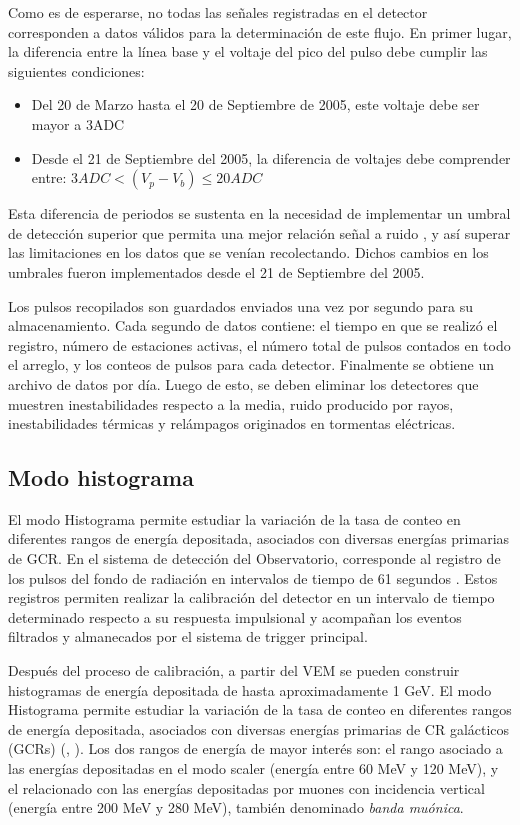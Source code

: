 Como es de esperarse, no todas las señales registradas en el detector corresponden a datos válidos para la determinación de este flujo. En primer lugar, la diferencia entre la línea base y el voltaje del pico del pulso debe cumplir las siguientes condiciones:

\begin{itemize}
    \item Del 20 de Marzo hasta el 20 de Septiembre de 2005, este voltaje debe ser mayor a 3ADC
    \item Desde el 21 de Septiembre del 2005, la diferencia de voltajes debe comprender entre: $3ADC < (V_{p}-V_{b}) \leq 20ADC $
\end{itemize}

Esta diferencia de periodos se sustenta en la necesidad de implementar un umbral de detección superior que permita una mejor relación señal a ruido \cite{bertou_2007}, y así superar las limitaciones en los datos que se venían recolectando. Dichos cambios en los umbrales fueron implementados desde el 21 de Septiembre del 2005.

Los pulsos recopilados son guardados enviados una vez por segundo para su almacenamiento. Cada segundo de datos contiene: el tiempo en que se realizó el registro, número de estaciones activas, el número total de pulsos contados en todo el arreglo, y los conteos de pulsos para cada detector. Finalmente se obtiene un archivo de datos por día. Luego de esto, se deben eliminar los detectores que muestren inestabilidades respecto a la media, ruido producido por rayos, inestabilidades térmicas y relámpagos originados en tormentas eléctricas.  

\subsection{Modo histograma}

El modo Histograma permite estudiar la variación de la tasa de conteo en diferentes rangos de energía depositada, asociados con diversas energías primarias de GCR. En el sistema de detección del Observatorio, corresponde al registro de los pulsos del fondo de radiación en intervalos de tiempo de 61 segundos \cite{asorey_2012} . Estos registros permiten realizar la calibración del detector en un intervalo de tiempo determinado respecto a su respuesta impulsional y acompañan los eventos filtrados y almanecados por el sistema de trigger principal. 

Después del proceso de calibración, a partir del VEM se pueden construir histogramas de energía depositada de hasta aproximadamente 1 GeV. El modo Histograma permite estudiar la variación de la tasa de conteo en diferentes rangos de energía depositada, asociados con diversas energías primarias de CR galácticos (GCRs) (\cite{asorey_2012}, \cite{masias_2017}). Los dos rangos de energía de mayor interés son: el rango asociado a las energías depositadas en el modo scaler (energía entre 60 MeV y 120 MeV), y el relacionado con las energías depositadas por muones con incidencia vertical (energía entre 200 MeV y 280 MeV), también denominado \textit{banda muónica}. 

